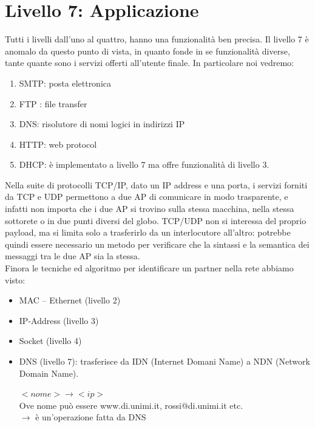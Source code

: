 \documentclass[11pt, oneside]{article}   	%
\begin{document}
\section*{Livello 7: Applicazione}
Tutti i livelli dall’uno al quattro, hanno una funzionalità ben precisa. Il livello 7 è anomalo da questo punto di vista, in quanto fonde in se funzionalità diverse, tante quante sono i servizi offerti all’utente finale. In particolare noi vedremo:
\begin{enumerate}
\item SMTP: posta elettronica
\item FTP : file transfer
\item DNS: risolutore di nomi logici in indirizzi IP
\item HTTP: web protocol
\item DHCP: è implementato a livello 7 ma offre funzionalità di livello 3.
\end{enumerate}
Nella suite di protocolli TCP/IP, dato un IP address e una porta, i servizi forniti da TCP e UDP permettono a due AP di comunicare in modo trasparente, e infatti non importa che i due AP si trovino sulla stessa macchina, nella stessa sottorete o in due punti diversi del globo. TCP/UDP non si interessa del proprio payload, ma si limita solo a trasferirlo da un interlocutore all’altro: potrebbe quindi essere necessario un metodo per verificare che la sintassi e la semantica dei messaggi tra le due AP sia la stessa.\\
Finora le tecniche ed algoritmo per identificare un partner nella rete abbiamo visto:
\begin{itemize}
\item MAC – Ethernet (livello 2)
\item IP-Address (livello 3)
\item Socket (livello 4)
\item DNS (livello 7): trasferisce da IDN (Internet Domani Name) a NDN (Network Domain Name).
\begin{center}
$<nome> \rightarrow <ip>$\\
Ove nome può essere www.di.unimi.it, rossi@di.unimi.it etc.\\
$\rightarrow$ è un'operazione fatta da DNS
\end{center}
\end{itemize}
\end{document}
